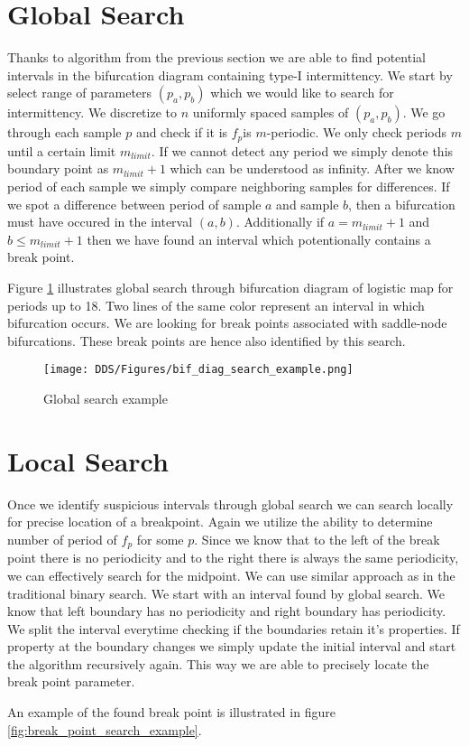 \section{Global Search}
Thanks to algorithm from the previous section we are able to find potential intervals in the bifurcation diagram containing type-I intermittency.
We start by select range of parameters $(p_a, p_b)$ which we would like to search for intermittency.
We discretize to $n$ uniformly spaced samples of $(p_a, p_b)$.
We go through each sample $p$ and check if it is $f_p$is $m$-periodic.
We only check periods $m$ until a certain limit $m_{limit}$.
If we cannot detect any period we simply denote this boundary point as $m_{limit}+1$ which can be understood as infinity.
After we know period of each sample we simply compare neighboring samples for differences.
If we spot a difference between period of sample $a$ and sample $b$, then a bifurcation must have occured in the interval $(a, b)$.
Additionally if $a=m_{limit}+1$ and $b \leq m_{limit}+1$ then we have found an interval which potentionally contains a break point.
\par
Figure \ref{fig:bif_diag_search_example} illustrates global search through bifurcation diagram of logistic map for periods up to 18.
Two lines of the same color represent an interval in which bifurcation occurs.
We are looking for break points associated with saddle-node bifurcations.
These break points are hence also identified by this search.

\begin{figure}[!h]
    \centering
    \texttt{[image: DDS/Figures/bif\_diag\_search\_example.png]}
    \caption{Global search example}
    \label{fig:bif_diag_search_example}
\end{figure}


\section{Local Search}
Once we identify suspicious intervals through global search we can search locally for precise location of a breakpoint.
Again we utilize the ability to determine number of period of $f_p$ for some $p$.
Since we know that to the left of the break point there is no periodicity and to the right there is always the same periodicity, we can effectively search for the midpoint.
We can use similar approach as in the traditional binary search.
We start with an interval found by global search.
We know that left boundary has no periodicity and right boundary has periodicity.
We split the interval everytime checking if the boundaries retain it's properties.
If property at the boundary changes we simply update the initial interval and start the algorithm recursively again.
This way we are able to precisely locate the break point parameter.
\par
An example of the found break point is illustrated in figure \ref{fig:break_point_search_example}.

